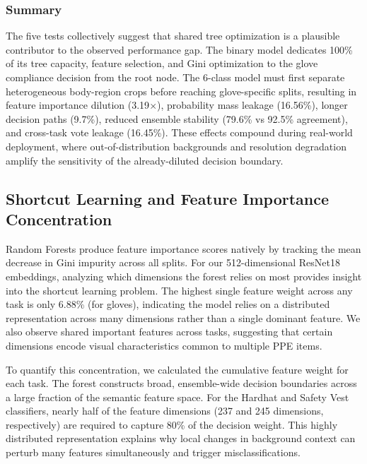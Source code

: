 \documentclass[11pt,a4paper]{article}
\begin{document}
\subsubsection{Summary}
The five tests collectively suggest that shared tree optimization is a plausible contributor to the observed performance gap. The binary model dedicates 100\% of its tree capacity, feature selection, and Gini optimization to the glove compliance decision from the root node. The 6-class model must first separate heterogeneous body-region crops before reaching glove-specific splits, resulting in feature importance dilution (3.19$\times$), probability mass leakage (16.56\%), longer decision paths (9.7\%), reduced ensemble stability (79.6\% vs 92.5\% agreement), and cross-task vote leakage (16.45\%). These effects compound during real-world deployment, where out-of-distribution backgrounds and resolution degradation amplify the sensitivity of the already-diluted decision boundary.
\subsection{Shortcut Learning and Feature Importance Concentration}
Random Forests produce feature importance scores natively by tracking the mean decrease in Gini impurity across all splits. For our 512-dimensional ResNet18 embeddings, analyzing which dimensions the forest relies on most provides insight into the shortcut learning problem. The highest single feature weight across any task is only 6.88\% (for gloves), indicating the model relies on a distributed representation across many dimensions rather than a single dominant feature. We also observe shared important features across tasks, suggesting that certain dimensions encode visual characteristics common to multiple PPE items.

To quantify this concentration, we calculated the cumulative feature weight for each task. The forest constructs broad, ensemble-wide decision boundaries across a large fraction of the semantic feature space. For the Hardhat and Safety Vest classifiers, nearly half of the feature dimensions (237 and 245 dimensions, respectively) are required to capture 80\% of the decision weight. This highly distributed representation explains why local changes in background context can perturb many features simultaneously and trigger misclassifications.
\end{document}
